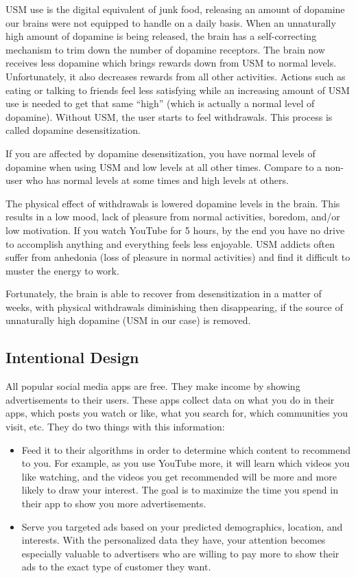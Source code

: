\documentclass[
  openany]{book}
\providecommand{\tightlist}{%
  \setlength{\itemsep}{0pt}\setlength{\parskip}{0pt}}
\begin{document}
USM use is the digital equivalent of junk food, releasing an amount of dopamine our brains were not equipped to handle on a daily basis. When an unnaturally high amount of dopamine is being released, the brain has a self-correcting mechanism to trim down the number of dopamine receptors. The brain now receives less dopamine which brings rewards down from USM to normal levels. Unfortunately, it also decreases rewards from all other activities. Actions such as eating or talking to friends feel less satisfying while an increasing amount of USM use is needed to get that same ``high'' (which is actually a normal level of dopamine). Without USM, the user starts to feel withdrawals. This process is called dopamine desensitization.

If you are affected by dopamine desensitization, you have normal levels of dopamine when using USM and low levels at all other times. Compare to a non-user who has normal levels at some times and high levels at others.

The physical effect of withdrawals is lowered dopamine levels in the brain. This results in a low mood, lack of pleasure from normal activities, boredom, and/or low motivation. If you watch YouTube for 5 hours, by the end you have no drive to accomplish anything and everything feels less enjoyable. USM addicts often suffer from anhedonia (loss of pleasure in normal activities) and find it difficult to muster the energy to work.

Fortunately, the brain is able to recover from desensitization in a matter of weeks, with physical withdrawals diminishing then disappearing, if the source of unnaturally high dopamine (USM in our case) is removed.

\subsection{Intentional Design}\label{intentional-design}

All popular social media apps are free. They make income by showing advertisements to their users. These apps collect data on what you do in their apps, which posts you watch or like, what you search for, which communities you visit, etc. They do two things with this information:

\begin{itemize}
\tightlist
\item
  Feed it to their algorithms in order to determine which content to recommend to you. For example, as you use YouTube more, it will learn which videos you like watching, and the videos you get recommended will be more and more likely to draw your interest. The goal is to maximize the time you spend in their app to show you more advertisements.
\item
  Serve you targeted ads based on your predicted demographics, location, and interests. With the personalized data they have, your attention becomes especially valuable to advertisers who are willing to pay more to show their ads to the exact type of customer they want.
\end{itemize}
\end{document}
